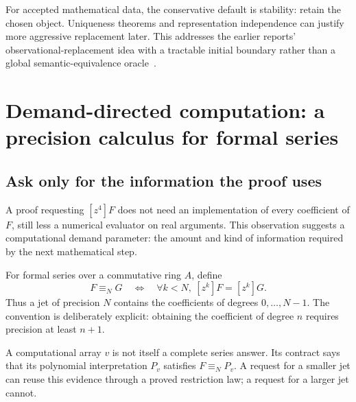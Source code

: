\documentclass[11pt,a4paper]{article}
\theoremstyle{definition}
\begin{document}
For accepted mathematical data, the conservative default is stability: retain the chosen object. Uniqueness theorems and representation independence can justify more aggressive replacement later. This addresses the earlier reports' observational-replacement idea with a tractable initial boundary rather than a global semantic-equivalence oracle~\cite{synA}.

\section{Demand-directed computation: a precision calculus for formal series}\label{sec:jets}

\subsection{Ask only for the information the proof uses}
A proof requesting \([z^4]F\) does not need an implementation of every coefficient of \(F\), still less a numerical evaluator on real arguments. This observation suggests a computational demand parameter: the amount and kind of information required by the next mathematical step.

For formal series over a commutative ring \(A\), define
\[
 F\equiv_N G
 \quad\Longleftrightarrow\quad
 \forall k<N,\ [z^k]F=[z^k]G.
\]
Thus a jet of precision \(N\) contains the coefficients of degrees \(0,\ldots,N-1\). The convention is deliberately explicit: obtaining the coefficient of degree \(n\) requires precision at least \(n+1\).

A computational array \(v\) is not itself a complete series answer. Its contract says that its polynomial interpretation \(P_v\) satisfies \(F\equiv_N P_v\). A request for a smaller jet can reuse this evidence through a proved restriction law; a request for a larger jet cannot.
\end{document}
